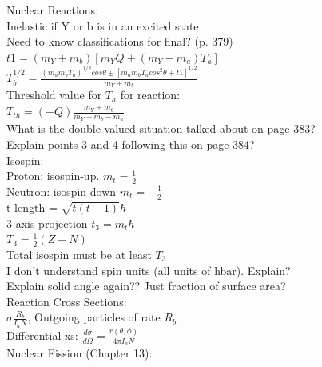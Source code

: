 \documentclass{article}
\begin{document}
\begin{multicols}{3}
Nuclear Reactions:\\
Inelastic if Y or b is in an excited state\\
Need to know classifications for final? (p. 379)\\
$t1 =  (m_{Y}+m_{b})[m_{Y}Q + (m_{Y}-m_{a})T_{a}]$
$T_{b}^{1/2} = \frac{(m_{a}m_{b}T_{a})^{1/2}cos\theta \pm [ m_{a}m_{b}T_{a}cos^{2}\theta + t1 ]^{1/2}}{m_{Y} + m_{b}}$\\
Threshold value for $T_{a}$ for reaction:\\
\hspace*{0.01\textwidth} $T_{th} = (-Q)\frac{m_{Y} + m_{b}}{m_{Y}+m_{b}-m_{a}}$\\
What is the double-valued situation talked about on page 383?\\
Explain points 3 and 4 following this on page 384?\\
Isospin:\\
\hspace*{0.01\textwidth} Proton: isospin-up. $m_{t} = \frac{1}{2}$\\
\hspace*{0.01\textwidth} Neutron: isospin-down $m_{t} = -\frac{1}{2}$\\
\hspace*{0.01\textwidth} t length = $\sqrt{t(t+1)}\hbar$\\
\hspace*{0.01\textwidth} 3 axis projection $t_{3} = m_{t}\hbar$\\
\hspace*{0.01\textwidth} $T_{3} = \frac{1}{2} (Z-N)$\\
\hspace*{0.01\textwidth} Total isospin must be at least $T_{3}$\\
I don't understand spin units (all units of hbar).  Explain?\\
Explain solid angle again?? Just fraction of surface area?\\

Reaction Cross Sections:\\
$\sigma \frac{R_{b}}{I_{a}N}$, Outgoing particles of rate $R_{b}$\\
Differential xs: $\frac{d\sigma}{d\Omega} = \frac{r(\theta,\phi)}{4\pi I_{a} N}$\\


Nuclear Fission (Chapter 13):\\


\end{multicols}
\end{document}
